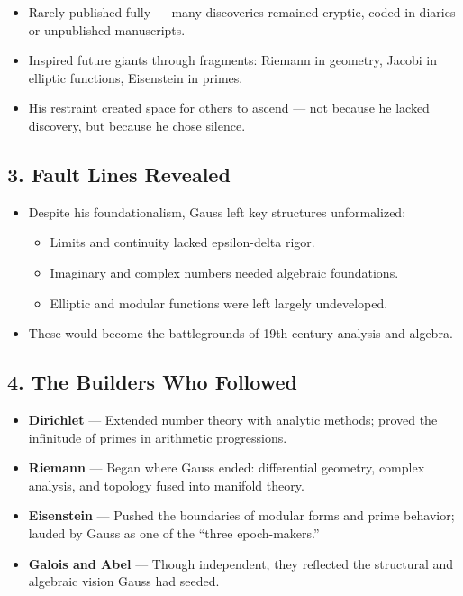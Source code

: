 \documentclass[9pt]{article}
\begin{document}
\begin{itemize}
  \item Rarely published fully — many discoveries remained cryptic, coded in diaries or unpublished manuscripts.
  \item Inspired future giants through fragments: Riemann in geometry, Jacobi in elliptic functions, Eisenstein in primes.
  \item His restraint created space for others to ascend — not because he lacked discovery, but because he chose silence.
\end{itemize}

\vspace{1em}

\subsection*{3. Fault Lines Revealed}

\begin{itemize}
  \item Despite his foundationalism, Gauss left key structures unformalized:
  \begin{itemize}
    \item Limits and continuity lacked epsilon-delta rigor.
    \item Imaginary and complex numbers needed algebraic foundations.
    \item Elliptic and modular functions were left largely undeveloped.
  \end{itemize}
  \item These would become the battlegrounds of 19th-century analysis and algebra.
\end{itemize}

\vspace{1em}

\subsection*{4. The Builders Who Followed}

\begin{itemize}
  \item \textbf{Dirichlet} — Extended number theory with analytic methods; proved the infinitude of primes in arithmetic progressions.
  \item \textbf{Riemann} — Began where Gauss ended: differential geometry, complex analysis, and topology fused into manifold theory.
  \item \textbf{Eisenstein} — Pushed the boundaries of modular forms and prime behavior; lauded by Gauss as one of the “three epoch-makers.”
  \item \textbf{Galois and Abel} — Though independent, they reflected the structural and algebraic vision Gauss had seeded.
\end{itemize}
\end{document}
